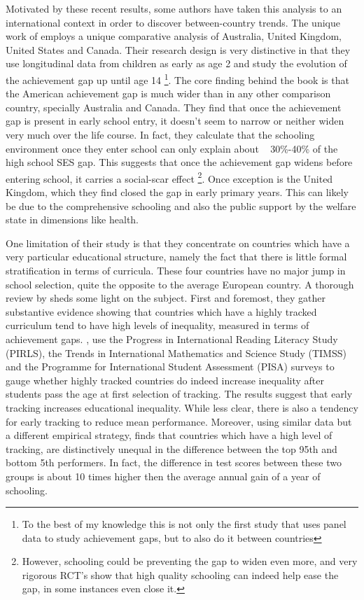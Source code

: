 \documentclass[11pt, a4paper]{article}\usepackage[]{graphicx}\usepackage[]{color}
\begin{document}
Motivated by these recent results, some authors have taken this analysis to an international context in order to discover between-country trends. The unique work of \citet{bradbury2015} employs a unique comparative analysis of Australia, United Kingdom, United States and Canada. Their research design is very distinctive in that they use longitudinal data from children as early as age 2 and study the evolution of the achievement gap up until age 14 \footnote{To the best of my knowledge this is not only the first study that uses panel data to study achievement gaps, but to also do it between countries}. The core finding behind the book is that the American achievement gap is much wider than in any other comparison country, specially Australia and Canada. They find that once the achievement gap is present in early school entry, it doesn't seem to narrow or neither widen very much over the life course. In fact, they calculate that the schooling environment once they enter school can only explain about ~ 30\%-40\% of the high school SES gap. This suggests that once the achievement gap widens before entering school, it carries a social-scar effect \footnote{However, schooling could be preventing the gap to widen even more, and very rigorous RCT's show that high quality schooling can indeed help ease the gap, in some instances even close it.}. Once exception is the United Kingdom, which they find closed the gap in early primary years. This can likely be due to the comprehensive schooling and also the public support by the welfare state in dimensions like health.

One limitation of their study is that they concentrate on countries which have a very particular educational structure, namely the fact that there is little formal stratification in terms of curricula. These four countries have no major jump in school selection, quite the opposite to the average European country. A thorough review by \citet{werfhorst_mijs} sheds some light on the subject. First and foremost, they gather substantive evidence showing that countries which have a highly tracked curriculum tend to have high levels of inequality, measured in terms of achievement gaps. \citet{hanushek_woesmann_tracking}, use the Progress in International Reading Literacy Study (PIRLS), the Trends in International Mathematics and Science Study (TIMSS) and the Programme for International Student Assessment (PISA) surveys to gauge whether highly tracked countries do indeed increase inequality after students pass the age at first selection of tracking. The results suggest that early tracking increases educational inequality. While less clear, there is also a tendency for early tracking to reduce mean performance. Moreover, \citet{micklewright} using similar data but a different empirical strategy, finds that countries which have a high level of tracking, are distinctively unequal in the difference between the top 95th and bottom 5th performers. In fact, the difference in test scores between these two groups is about 10 times higher then the average annual gain of a year of schooling.
\end{document}
